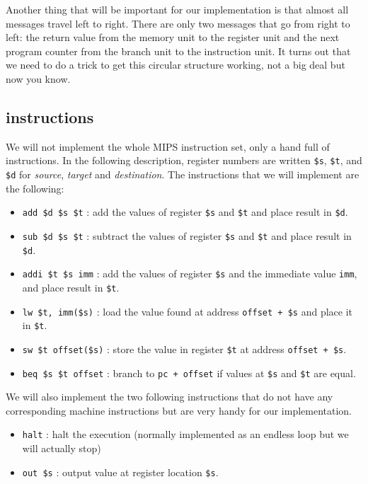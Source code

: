 \documentclass[a4paper,11pt]{article}
\begin{document}
Another thing that will be important for our implementation is that
almost all messages travel left to right. There are only two messages
that go from right to left: the return value from the memory unit to
the register unit and the next program counter from the branch unit to
the instruction unit. It turns out that we need to do a trick to get
this circular structure working, not a big deal but now you know.

\subsection*{instructions}

We will not implement the whole MIPS instruction set, only a hand full
of instructions. In the following description, register numbers are
written {\tt \$s}, {\tt \$t}, and {\tt \$d} for {\em source}, {\em
  target} and {\em destination}.  The instructions that we will
implement are the following:

\begin{itemize}

\item {\tt add \$d \$s \$t} : add the values of register {\tt \$s} and {\tt \$t} and place result in {\tt \$d}.

\item {\tt sub \$d \$s \$t} : subtract the values of register {\tt \$s} and {\tt \$t} and place result in {\tt \$d}.  

\item {\tt addi \$t \$s imm} : add the values of register {\tt \$s} and the immediate value {\tt imm}, and place result in {\tt \$t}.

\item {\tt lw \$t, imm(\$s)} : load the value found at address {\tt offset + \$s} and place it in {\tt \$t}.

\item {\tt sw \$t offset(\$s)} : store the value in register {\tt \$t} at address {\tt offset + \$s}. 

\item {\tt beq \$s \$t offset} : branch to {\tt pc + offset} if values at {\tt \$s} and  {\tt \$t} are equal.

\end{itemize}

We will also implement the two following instructions that do not
have any corresponding machine instructions but are very handy for our
implementation.

\begin{itemize}
\item {\tt halt} : halt the execution (normally implemented as an endless loop but we will actually stop)
\item {\tt out \$s} : output value at register location {\tt \$s}.
\end{itemize}
\end{document}
